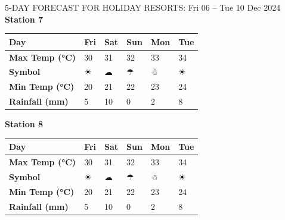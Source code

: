 \begin{frame}{5-DAY FORECAST FOR HOLIDAY RESORTS: Fri 06 – Tue 10 Dec 2024}
        \textbf{Station 7} \\
        \renewcommand{\arraystretch}{1.2} %
        \begin{tabular}{|p{2cm}|p{1.8cm}|p{1.8cm}|p{1.8cm}|p{1.8cm}|p{1.8cm}|}
        \hline
        \textbf{Day} & Fri & Sat & Sun & Mon & Tue \\ \hline
\textbf{Max Temp (°C)} & 30 & 31 & 32 & 33 & 34 \\ \hline
\textbf{Symbol} & ☀ & ☁ & ☂ & ☃ & ☀ \\ \hline
\textbf{Min Temp (°C)} & 20 & 21 & 22 & 23 & 24 \\ \hline
\textbf{Rainfall (mm)} & 5 & 10 & 0 & 2 & 8 \\ \hline
        \end{tabular}
        \vspace{0.5cm} %
        
        \textbf{Station 8} \\
        \renewcommand{\arraystretch}{1.2} %
        \begin{tabular}{|p{2cm}|p{1.8cm}|p{1.8cm}|p{1.8cm}|p{1.8cm}|p{1.8cm}|}
        \hline
        \textbf{Day} & Fri & Sat & Sun & Mon & Tue \\ \hline
\textbf{Max Temp (°C)} & 30 & 31 & 32 & 33 & 34 \\ \hline
\textbf{Symbol} & ☀ & ☁ & ☂ & ☃ & ☀ \\ \hline
\textbf{Min Temp (°C)} & 20 & 21 & 22 & 23 & 24 \\ \hline
\textbf{Rainfall (mm)} & 5 & 10 & 0 & 2 & 8 \\ \hline
        \end{tabular}
        \vspace{0.5cm} %
        \end{frame}

